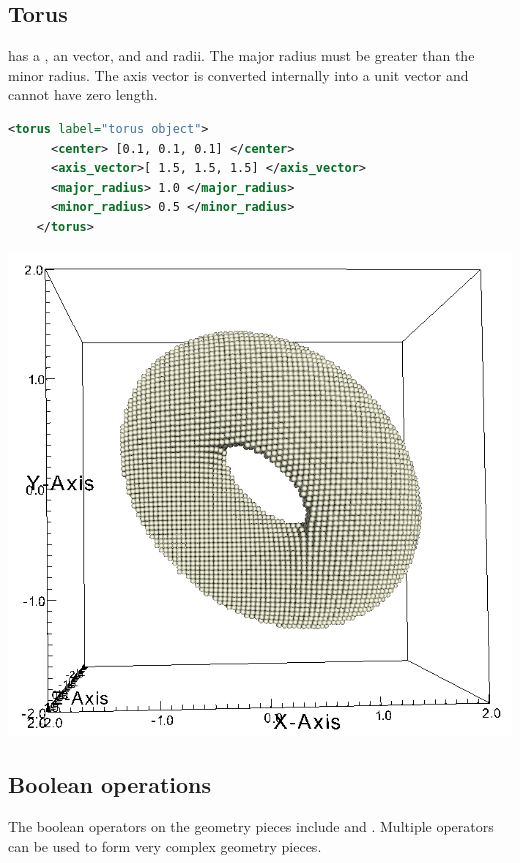 \subsection{Torus}
\begin{minipage}{0.6\textwidth}
   has a , an  vector,
  and  and  radii.   The major radius must
  be greater than the minor radius.  The axis vector is converted
  internally into a unit vector and cannot have zero length.
  \begin{lstlisting}[language=XML]
    <torus label="torus object">
      <center> [0.1, 0.1, 0.1] </center>
      <axis_vector>[ 1.5, 1.5, 1.5] </axis_vector>
      <major_radius> 1.0 </major_radius>
      <minor_radius> 0.5 </minor_radius>
    </torus>
  \end{lstlisting}
\end{minipage}
\begin{minipage}{0.4\textwidth}
  \centering
  \includegraphics[width=0.9\columnwidth]{FIGS/geometry/geom_torus.png}
\end{minipage}

\subsection{Boolean operations}
The boolean operators on the geometry pieces include  and .
Multiple operators can be used to form very complex geometry pieces.

